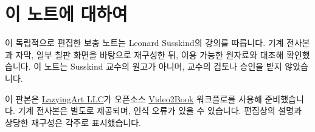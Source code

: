 \documentclass[11pt,oneside]{book}
\begin{document}
\frontmatter
\hypersetup{pageanchor=false}

\hypersetup{pageanchor=true}

\clearpage
\chapter{이 노트에 대하여}
이 독립적으로 편집한 보충 노트는 Leonard Susskind의 강의를 따릅니다. 기계 전사본과 자막, 일부 칠판 화면을 바탕으로 재구성한 뒤, 이용 가능한 원자료와 대조해 확인했습니다. 이 노트는 Susskind 교수의 원고가 아니며, 교수의 검토나 승인을 받지 않았습니다.

이 판본은 \href{https://lazying.art}{LazyingArt LLC}가 오픈소스 \href{https://github.com/lachlanchen/Video2Book}{Video2Book} 워크플로를 사용해 준비했습니다. 기계 전사본은 별도로 제공되며, 인식 오류가 있을 수 있습니다. 편집상의 설명과 상당한 재구성은 각주로 표시했습니다.
\clearpage
\tableofcontents
\mainmatter










\end{document}
